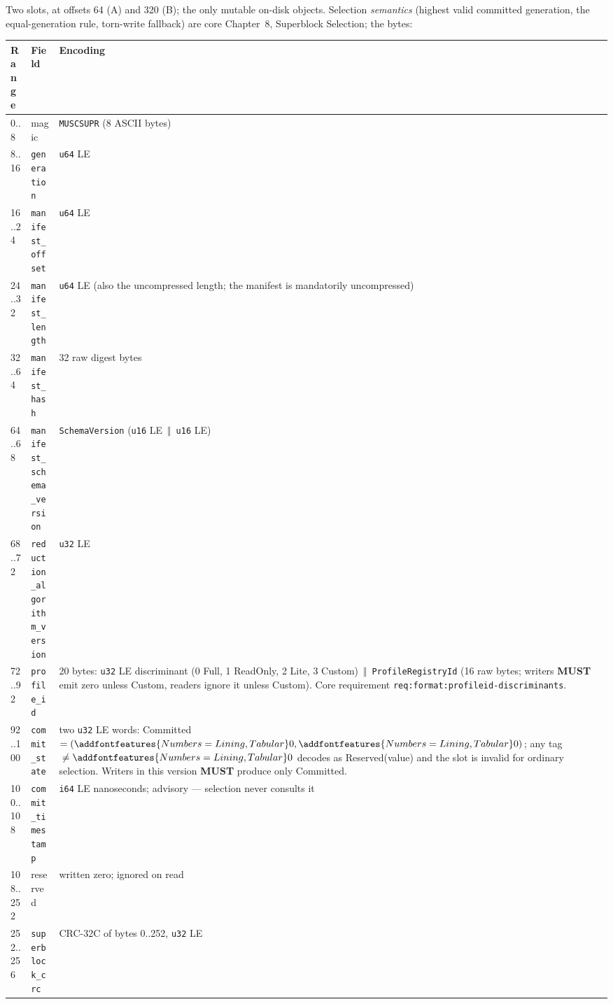 \documentclass[11pt,letterpaper]{report}
\newcommand{\tablenums}[1]{{\addfontfeatures{Numbers={Lining,Tabular}}#1}}
\newcommand{\sectionsc}[1]{{\addfontfeatures{Letters=SmallCaps}#1}}
\newcounter{requirement}[chapter]
\newcommand{\MUST}{\textbf{MUST}}
\newcommand{\cat}{\ensuremath{\,\Vert\,}}
\begin{document}
Two slots, at offsets 64 (A) and 320 (B); the only mutable on-disk objects.
Selection \emph{semantics} (highest valid committed generation, the
equal-generation rule, torn-write fallback) are core Chapter~8,
\sectionsc{Superblock Selection}; the bytes:

\begingroup\small
\begin{longtable}{p{0.9in} p{2.15in} p{2.55in}}
  \toprule
  \textbf{Range} & \textbf{Field} & \textbf{Encoding} \\
  \midrule
  \endhead
  \tablenums{0..8} & magic & \texttt{MUSCSUPR} (8 ASCII bytes) \\
  \tablenums{8..16} & \texttt{generation} & \texttt{u64} LE \\
  \tablenums{16..24} & \texttt{manifest\_offset} & \texttt{u64} LE \\
  \tablenums{24..32} & \texttt{manifest\_length} & \texttt{u64} LE (also the
    uncompressed length; the manifest is mandatorily uncompressed) \\
  \tablenums{32..64} & \texttt{manifest\_hash} & 32 raw digest bytes \\
  \tablenums{64..68} & \texttt{manifest\_schema\_version} &
    \texttt{SchemaVersion} (\texttt{u16} LE \cat{} \texttt{u16} LE) \\
  \tablenums{68..72} & \texttt{reduction\_algorithm\_version} &
    \texttt{u32} LE \\
  \tablenums{72..92} & \texttt{profile\_id} & 20 bytes: \texttt{u32} LE
    discriminant (\tablenums{0} Full, \tablenums{1} ReadOnly,
    \tablenums{2} Lite, \tablenums{3} Custom) \cat{}
    \texttt{ProfileRegistryId} (16 raw bytes; writers \MUST{} emit zero
    unless Custom, readers ignore it unless Custom). Core requirement
    \texttt{req:format:profileid-discriminants}. \\
  \tablenums{92..100} & \texttt{commit\_state} & two \texttt{u32} LE words:
    Committed $= (\tablenums{0}, \tablenums{0})$; any tag
    ${}\neq \tablenums{0}$ decodes as Reserved(value) and the slot is
    invalid for ordinary selection. Writers in this version \MUST{} produce
    only Committed. \\
  \tablenums{100..108} & \texttt{commit\_timestamp} & \texttt{i64} LE
    nanoseconds; advisory --- selection never consults it \\
  \tablenums{108..252} & reserved & written zero; ignored on read \\
  \tablenums{252..256} & \texttt{superblock\_crc} & CRC-32C of bytes
    \tablenums{0..252}, \texttt{u32} LE \\
  \bottomrule
\end{longtable}
\endgroup
\end{document}
